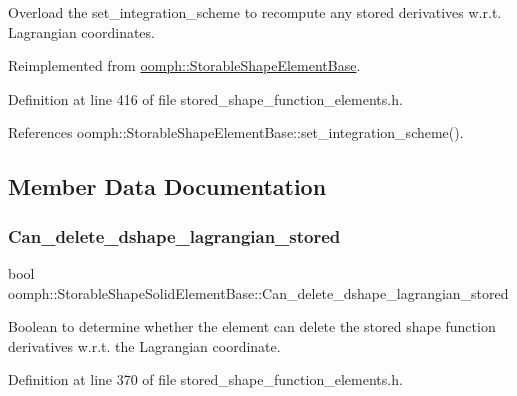Overload the set\+\_\+integration\+\_\+scheme to recompute any stored derivatives w.\+r.\+t. Lagrangian coordinates. 



Reimplemented from \hyperlink{classoomph_1_1StorableShapeElementBase_a1c20f4028654ec94f57037a3e3dc6582}{oomph\+::\+Storable\+Shape\+Element\+Base}.



Definition at line 416 of file stored\+\_\+shape\+\_\+function\+\_\+elements.\+h.



References oomph\+::\+Storable\+Shape\+Element\+Base\+::set\+\_\+integration\+\_\+scheme().



\subsection{Member Data Documentation}
\mbox{\label{classoomph_1_1StorableShapeSolidElementBase_acacb2dca4af0a7f55c63ddc8a4d952f8}} 
\subsubsection{\texorpdfstring{Can\+\_\+delete\+\_\+dshape\+\_\+lagrangian\+\_\+stored}{Can\_delete\_dshape\_lagrangian\_stored}}
{\footnotesize\ttfamily bool oomph\+::\+Storable\+Shape\+Solid\+Element\+Base\+::\+Can\+\_\+delete\+\_\+dshape\+\_\+lagrangian\+\_\+stored\hspace{0.3cm}{\ttfamily [private]}}



Boolean to determine whether the element can delete the stored shape function derivatives w.\+r.\+t. the Lagrangian coordinate. 



Definition at line 370 of file stored\+\_\+shape\+\_\+function\+\_\+elements.\+h.

\mbox{\label{classoomph_1_1StorableShapeSolidElementBase_a5b70ba5dbc22fa3d5741b1cf0791f84b}} 
